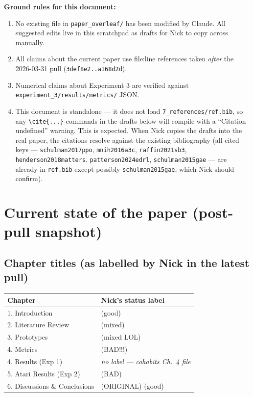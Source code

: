 \documentclass[11pt,a4paper]{article}
\newcommand{\fileline}[1]{\texttt{\small #1}}
\begin{document}
\textbf{Ground rules for this document:}
\begin{enumerate}[leftmargin=*]
  \item No existing file in \fileline{paper\_overleaf/} has been modified by
  Claude. All suggested edits live in this scratchpad as drafts for Nick to
  copy across manually.
  \item All claims about the current paper use file:line references taken
  \emph{after} the 2026-03-31 pull
  (\fileline{3def8e2..a168d2d}).
  \item Numerical claims about Experiment 3 are verified against
  \fileline{experiment\_3/results/metrics/} JSON.
  \item This document is standalone --- it does not load
  \fileline{7\_references/ref.bib}, so any \fileline{\textbackslash cite\{...\}}
  commands in the drafts below will compile with a
  ``Citation undefined'' warning. This is expected. When Nick copies the
  drafts into the real paper, the citations resolve against the existing
  bibliography (all cited keys --- \fileline{schulman2017ppo},
  \fileline{mnih2016a3c}, \fileline{raffin2021sb3},
  \fileline{henderson2018matters}, \fileline{patterson2024edrl},
  \fileline{schulman2015gae} --- are already in
  \fileline{ref.bib} except possibly \fileline{schulman2015gae}, which
  Nick should confirm).
\end{enumerate}

\section{Current state of the paper (post-pull snapshot)}\label{sec:state}

\subsection*{Chapter titles (as labelled by Nick in the latest pull)}

\begin{tabular}{p{4.5cm}l}
\toprule
Chapter & Nick's status label \\
\midrule
1. Introduction                     & (good) \\
2. Literature Review                & (mixed) \\
3. Prototypes                       & (mixed LOL) \\
4. Metrics                          & (BAD!!!)\\
4. Results (Exp 1)                  & \emph{no label --- cohabits Ch.~4 file} \\
5. Atari Results (Exp 2)            & (BAD) \\
6. Discussions \& Conclusions       & (ORIGINAL) (good) \\
\bottomrule
\end{tabular}
\end{document}
